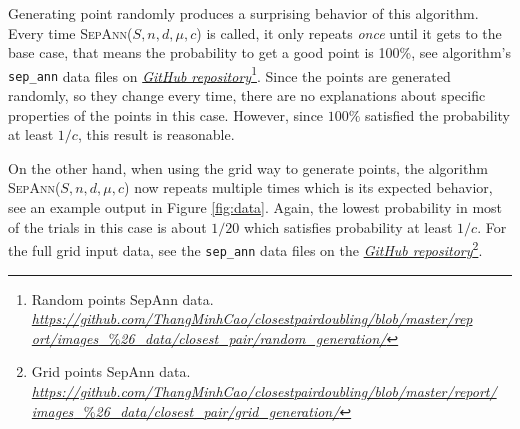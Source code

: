\documentclass[12pt,english,]{article}
\newcommand{\code}[1]{\colorbox{light-gray}{\texttt{#1}}}
\begin{document}
Generating point randomly produces a surprising behavior of this
algorithm. Every time \textsc{SepAnn($S,n,d,\mu,c$)} is called, it only
repeats \emph{once} until it gets to the base case, that means the
probability to get a good point is 100\%, see algorithm's
\code{sep\_ann} data files on
\href{https://github.com/ThangMinhCao/closestpairdoubling/blob/master/report/images_\%26_data/closest_pair/random_generation/}{\emph{GitHub
repository}}\footnote{Random points SepAnn data.
  \href{https://github.com/ThangMinhCao/closestpairdoubling/blob/master/report/images_\%26_data/closest_pair/random_generation/}{\emph{https://github.com/ThangMinhCao/closestpairdoubling/blob/master/rep
  ort/images}\_\%\emph{26\_data/closest\_pair/random\_generation/}}}.
Since the points are generated randomly, so they change every time,
there are no explanations about specific properties of the points in
this case. However, since \(100\%\) satisfied the probability at least
\(1/c\), this result is reasonable.

On the other hand, when using the grid way to generate points, the
algorithm \textsc{SepAnn($S,n,d,\mu,c$)} now repeats multiple times
which is its expected behavior, see an example output in Figure
\ref{fig:data}. Again, the lowest probability in most of the trials in
this case is about \(1/20\) which satisfies probability at least
\(1/c\). For the full grid input data, see the \code{sep\_ann} data
files on the
\href{https://github.com/ThangMinhCao/closestpairdoubling/blob/master/report/images_\%26_data/closest_pair/grid_generation/}{\emph{GitHub
repository}}\footnote{Grid points SepAnn data.
  \href{https://github.com/ThangMinhCao/closestpairdoubling/blob/master/report/images_\%26_data/closest_pair/grid_generation/}{\emph{https://github.com/ThangMinhCao/closestpairdoubling/blob/master/report/}
  \emph{images}\_\%\emph{26\_data/closest\_pair/grid\_generation/}}}.
\end{document}
